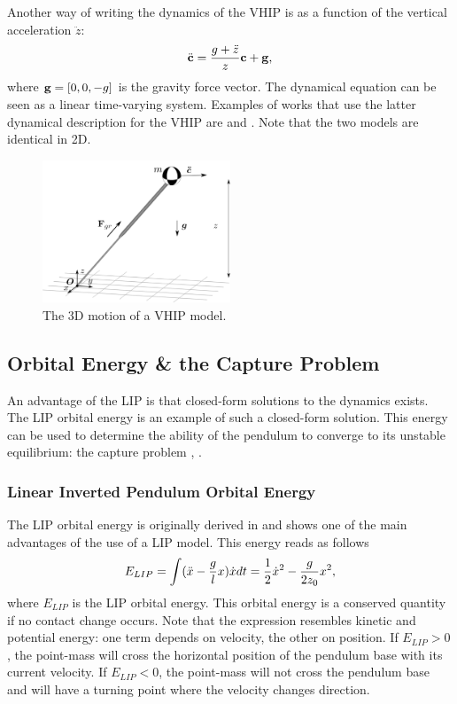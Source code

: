 Another way of writing the dynamics of the \ac{VHIP} is as a function of the vertical acceleration $\ddot{z}$:
\begin{equation}
	\ddot{\mathbf{c}} = \frac{g+\ddot{z}}{z}\mathbf{c} + \mathbf{g},
	\label{eq:dynamicscaronstyle}
\end{equation}
where $\mathbf{g}=[0,0,-g]$ is the gravity force vector. The dynamical equation can be seen as a linear time-varying system. Examples of works that use the latter dynamical description for the \ac{VHIP} are \cite{hopkins2014humanoid} and \cite{caron2018balance}. Note that the two models are identical in \ac{2D}.
\begin{figure}
\centering
\includegraphics[width=0.5\textwidth]{STYLESTUFF/3DCoMwithoutfootVHIP.png}
\caption{The \ac{3D} motion of a \ac{VHIP} model.}
\label{fig:3dvhip}
\end{figure}

\subsection{Orbital Energy \& the Capture Problem}\label{sec:ewalking}
An advantage of the \ac{LIP} is that closed-form solutions to the dynamics exists. The \ac{LIP} orbital energy is an example of such a closed-form solution. This energy can be used to determine the ability of the pendulum to converge to its unstable equilibrium: the capture problem \cite{pratt2006capture}, \cite{koolen2012capturability}.

\subsubsection{Linear Inverted Pendulum Orbital Energy}\label{subsec:liporbit} 
The \ac{LIP} orbital energy is originally derived in \cite{kajita1992dynamic} and shows one of the main advantages of the use of a \ac{LIP} model.  This energy reads as follows
\begin{equation}
E_{LIP} = \int (\ddot{x}-\frac{g}{l}x)\dot{x} dt = \frac{1}{2}\dot{x}^2-\frac{g}{2z_0}x^2,
\label{eq:Elip}
\end{equation}
where $E_{LIP}$ is the \ac{LIP} orbital energy. This orbital energy is a conserved quantity if no contact change occurs. Note that the expression resembles kinetic and potential energy: one term depends on velocity, the other on position. If $E_{LIP}>0$, the point-mass will cross the horizontal position of the pendulum base with its current velocity. If $E_{LIP}<0$, the point-mass will not cross the pendulum base and will have a turning point where the velocity changes direction.

